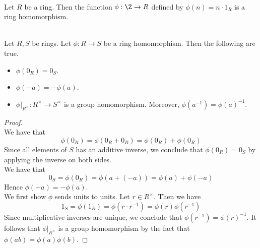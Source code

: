 \documentclass[a4paper]{article}
\begin{document}
\begin{eg}{}{}\\
Let $R$ be a ring. Then the function $\phi:\Z\to R$ defined by $\phi(n)=n\cdot 1_R$ is a ring homomorphism. 
\end{eg}

\begin{lmm}{}{}\\
Let $R,S$ be rings. Let $\phi:R\to S$ be a ring homomorphism. Then the following are true. 
\begin{itemize}
\item $\phi(0_R)=0_S$. 
\item $\phi(-a)=-\phi(a)$. 
\item $\phi|_{R^\times}:R^\times\to S^\times$ is a group homomorphism. Moreover, $\phi(a^{-1})=\phi(a)^{-1}$. 
\end{itemize} 
\begin{proof}\\
We have that $$\phi(0_R)=\phi(0_R+0_R)=\phi(0_R)+\phi(0_R)$$ Since all elements of $S$ has an additive inverse, we conclude that $\phi(0_R)=0_S$ by applying the inverse on both sides. \\

We have that $$0_S=\phi(0_R)=\phi(a+(-a))=\phi(a)+\phi(-a)$$ Hence $\phi(-a)=-\phi(a)$. \\

We first show $\phi$ sends units to units. Let $r\in R^\times$. Then we have $$1_S=\phi(1_R)=\phi(r\cdot r^{-1})=\phi(r)\phi(r^{-1})$$ Since multiplicative inverses are unique, we conclude that $\phi(r^{-1})=\phi(r)^{-1}$. It follows that $\phi|_{R^\times}$ is a group homomorphism by the fact that $\phi(ab)=\phi(a)\phi(b)$. 
\end{proof}
\end{lmm}
\end{document}
